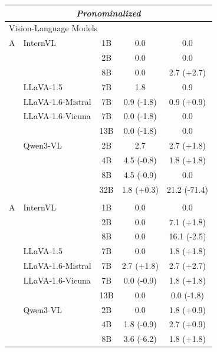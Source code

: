 \begin{table}[t]
{\begin{tabular}{llc|cc}
\midrule
\multicolumn{5}{c}{\textit{Pronominalized}} \\
\midrule
\multicolumn{5}{l}{Vision-Language Models} \\
A & InternVL & 1B & 0.0 & 0.0 \\
 &  & 2B & 0.0 & 0.0 \\
 &  & 8B & 0.0 & 2.7 \textcolor{[HTML]{0072B2}}{(+2.7)} \\
 & LLaVA-1.5 & 7B & 1.8 & 0.9 \\
 & LLaVA-1.6-Mistral & 7B & 0.9 \textcolor{[HTML]{CC7A00}}{(-1.8)} & 0.9 \textcolor{[HTML]{0072B2}}{(+0.9)} \\
 & LLaVA-1.6-Vicuna & 7B & 0.0 \textcolor{[HTML]{CC7A00}}{(-1.8)} & 0.0 \\
 &  & 13B & 0.0 \textcolor{[HTML]{CC7A00}}{(-1.8)} & 0.0 \\
 & Qwen3-VL & 2B & 2.7 & 2.7 \textcolor{[HTML]{0072B2}}{(+1.8)} \\
 &  & 4B & 4.5 \textcolor{[HTML]{CC7A00}}{(-0.8)} & 1.8 \textcolor{[HTML]{0072B2}}{(+1.8)} \\
 &  & 8B & 4.5 \textcolor{[HTML]{CC7A00}}{(-0.9)} & 0.0 \\
 &  & 32B & 1.8 \textcolor{[HTML]{0072B2}}{(+0.3)} & 21.2 \textcolor{[HTML]{CC7A00}}{(-71.4)} \\
\addlinespace[1pt]
\multicolumn{5}{l}{VLM Backbone Decoders} \\
A & InternVL & 1B & 0.0 & 0.0 \\
 &  & 2B & 0.0 & 7.1 \textcolor{[HTML]{0072B2}}{(+1.8)} \\
 &  & 8B & 0.0 & 16.1 \textcolor{[HTML]{CC7A00}}{(-2.5)} \\
 & LLaVA-1.5 & 7B & 0.0 & 1.8 \textcolor{[HTML]{0072B2}}{(+1.8)} \\
 & LLaVA-1.6-Mistral & 7B & 2.7 \textcolor{[HTML]{0072B2}}{(+1.8)} & 2.7 \textcolor{[HTML]{0072B2}}{(+2.7)} \\
 & LLaVA-1.6-Vicuna & 7B & 0.0 \textcolor{[HTML]{CC7A00}}{(-0.9)} & 1.8 \textcolor{[HTML]{0072B2}}{(+1.8)} \\
 &  & 13B & 0.0 & 0.0 \textcolor{[HTML]{CC7A00}}{(-1.8)} \\
 & Qwen3-VL & 2B & 0.0 & 1.8 \textcolor{[HTML]{0072B2}}{(+0.9)} \\
 &  & 4B & 1.8 \textcolor{[HTML]{CC7A00}}{(-0.9)} & 2.7 \textcolor{[HTML]{0072B2}}{(+0.9)} \\
 &  & 8B & 3.6 \textcolor{[HTML]{CC7A00}}{(-6.2)} & 1.8 \textcolor{[HTML]{0072B2}}{(+1.8)} \\

\end{tabular}}
\end{table}
